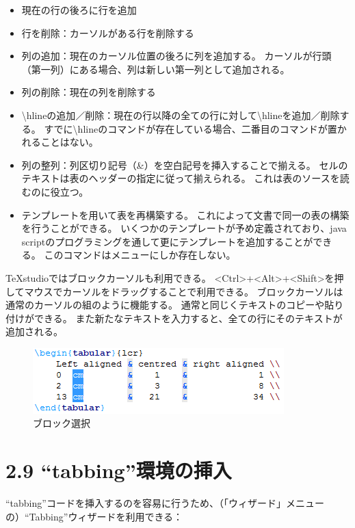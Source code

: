 \documentclass[]{book}
\makeatletter
\def\maxwidth{\ifdim\Gin@nat@width>\linewidth\linewidth
\else\Gin@nat@width\fi}
\let\Oldincludegraphics\includegraphics
\renewcommand{\includegraphics}[1]{\Oldincludegraphics[width=\maxwidth]{#1}}
\makeatother
\begin{document}
\begin{itemize}
\item
  現在の行の後ろに行を追加
\item
  行を削除：カーソルがある行を削除する
\item
  列の追加：現在のカーソル位置の後ろに列を追加する。
  カーソルが行頭（第一列）にある場合、列は新しい第一列として追加される。
\item
  列の削除：現在の列を削除する
\item
  \textbackslash{}hlineの追加／削除：現在の行以降の全ての行に対して\textbackslash{}hlineを追加／削除する。
  すでに\textbackslash{}hlineのコマンドが存在している場合、二番目のコマンドが置かれることはない。
\item
  列の整列：列区切り記号（\&）を空白記号を挿入することで揃える。
  セルのテキストは表のヘッダーの指定に従って揃えられる。
  これは表のソースを読むのに役立つ。
\item
  テンプレートを用いて表を再構築する。
  これによって文書で同一の表の構築を行うことができる。
  いくつかのテンプレートが予め定義されており、java
  scriptのプログラミングを通して更にテンプレートを追加することができる。
  このコマンドはメニューにしか存在しない。
\end{itemize}

TeXstudioではブロックカーソルも利用できる。
\textless{}Ctrl\textgreater{}+\textless{}Alt\textgreater{}+\textless{}Shift\textgreater{}を押してマウスでカーソルをドラッグすることで利用できる。
ブロックカーソルは通常のカーソルの組のように機能する。
通常と同じくテキストのコピーや貼り付けができる。
また新たなテキストを入力すると、全ての行にそのテキストが追加される。

\begin{figure}[htbp]
\centering
\includegraphics{block_selection.png}
\caption{ブロック選択}
\end{figure}

\section{2.9 ``tabbing''環境の挿入}

``tabbing''コードを挿入するのを容易に行うため、（「ウィザード」メニューの）``Tabbing''ウィザードを利用できる：
\end{document}
